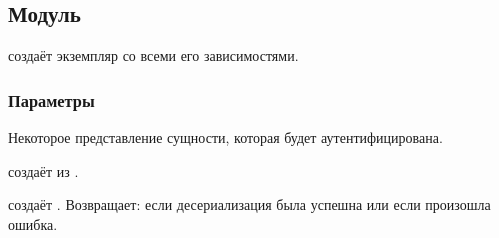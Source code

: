\subsection{Модуль }\label{page-FPauth-core-module-FPauth+u+core-module-Router-module-Make}%
 создаёт экземпляр \hyperref[page-FPauth-core-module-FPauth+u+core-module-Auth+u+sign-module-type-ROUTER]{} со всеми его зависимостями.

\subsubsection{Параметры\label{parameters}}%
\label{page-FPauth-core-module-FPauth+u+core-module-Router-module-Make-argument-1-M}\begin{ocamlindent}\label{page-FPauth-core-module-FPauth+u+core-module-Router-module-Make-argument-1-M-type-t}\begin{ocamlindent}Некоторое представление сущности, которая будет аутентифицирована.\end{ocamlindent}%
\medbreak
\label{page-FPauth-core-module-FPauth+u+core-module-Router-module-Make-argument-1-M-val-serialize}\begin{ocamlindent} создаёт  из \hyperref[page-FPauth-core-module-FPauth+u+core-module-Router-module-Make-argument-1-M-type-t]{}.\end{ocamlindent}%
\medbreak
\label{page-FPauth-core-module-FPauth+u+core-module-Router-module-Make-argument-1-M-val-deserialize}\begin{ocamlindent} создаёт \hyperref[page-FPauth-core-module-FPauth+u+core-module-Router-module-Make-argument-1-M-type-t]{}. Возвращает:  если десериализация была успешна или  если произошла ошибка.\end{ocamlindent}%

\end{ocamlindent}
